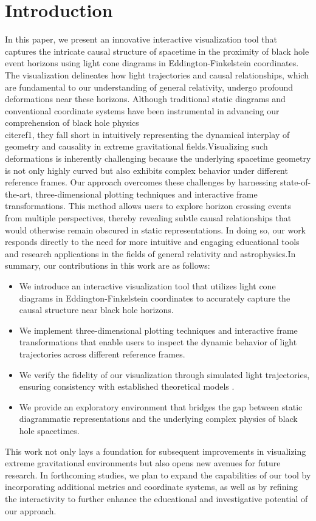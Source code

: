\documentclass{article}
\begin{document}
\section{Introduction}In this paper, we present an innovative interactive visualization tool that captures the intricate causal structure of spacetime in the proximity of black hole event horizons using light cone diagrams in Eddington-Finkelstein coordinates. The visualization delineates how light trajectories and causal relationships, which are fundamental to our understanding of general relativity, undergo profound deformations near these horizons. Although traditional static diagrams and conventional coordinate systems have been instrumental in advancing our comprehension of black hole physics \\cite{ref1}, they fall short in intuitively representing the dynamical interplay of geometry and causality in extreme gravitational fields.Visualizing such deformations is inherently challenging because the underlying spacetime geometry is not only highly curved but also exhibits complex behavior under different reference frames. Our approach overcomes these challenges by harnessing state-of-the-art, three-dimensional plotting techniques and interactive frame transformations. This method allows users to explore horizon crossing events from multiple perspectives, thereby revealing subtle causal relationships that would otherwise remain obscured in static representations. In doing so, our work responds directly to the need for more intuitive and engaging educational tools and research applications in the fields of general relativity and astrophysics.In summary, our contributions in this work are as follows:\begin{itemize}  \item We introduce an interactive visualization tool that utilizes light cone diagrams in Eddington-Finkelstein coordinates to accurately capture the causal structure near black hole horizons.  \item We implement three-dimensional plotting techniques and interactive frame transformations that enable users to inspect the dynamic behavior of light trajectories across different reference frames.  \item We verify the fidelity of our visualization through simulated light trajectories, ensuring consistency with established theoretical models \cite{ref2}.  \item We provide an exploratory environment that bridges the gap between static diagrammatic representations and the underlying complex physics of black hole spacetimes.\end{itemize}This work not only lays a foundation for subsequent improvements in visualizing extreme gravitational environments but also opens new avenues for future research. In forthcoming studies, we plan to expand the capabilities of our tool by incorporating additional metrics and coordinate systems, as well as by refining the interactivity to further enhance the educational and investigative potential of our approach.
\end{document}
